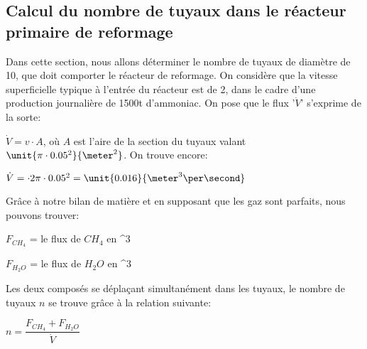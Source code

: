 \documentclass{article}
\begin{document}
\subsection{Calcul du nombre de tuyaux dans le réacteur primaire de reformage}

Dans cette section, nous allons déterminer le nombre de tuyaux de diamètre de \unit{10}{\centi\meter}, que doit comporter le réacteur de reformage. On considère que la vitesse superficielle typique à l'entrée du réacteur est de \unit{2}{\meter\per\second}, dans le cadre d'une production journalière de \unit{1500}{t} d'ammoniac. On pose que le flux '$\dot{V}$' s'exprime de la sorte:

$\dot{V} = v \cdot A$, où $A$ est l'aire de la section du tuyaux valant $\unit{\pi \cdot 0.05^2}{\meter ^2}$. On trouve encore:

$\dot{V} = \cdot 2 \pi \cdot 0.05^2 = \unit{0.016}{\meter ^3 \per\second}$

Grâce à notre bilan de matière et en supposant que les gaz sont parfaits, nous pouvons trouver:

$F_{CH_4}$ = le flux de $CH_4$ en \unit{}{\meter ^3 \per\second}

$F_{H_2O}$ = le flux de $H_2O$ en \unit{}{\meter ^3 \per\second}

Les deux composés se déplaçant simultanément dans les tuyaux, le nombre de tuyaux $n$ se trouve grâce à la relation suivante:

$n = \dfrac{F_{CH_4} + F_{H_2O}}{\dot{V}}$
\end{document}
